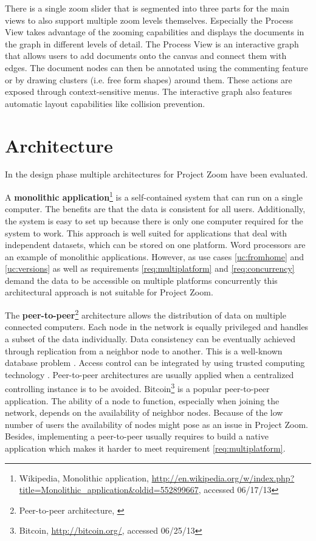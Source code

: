 There is a single zoom slider that is segmented into three parts for the main views to also support multiple zoom levels themselves. Especially the Process View takes advantage of the zooming capabilities and displays the documents in the graph in different levels of detail. 
The Process View is an interactive graph that allows users to add documents onto the canvas and connect them with edges. The document nodes can then be annotated using the commenting feature or by drawing clusters (i.e. free form shapes) around them. These actions are exposed through context-sensitive menus. The interactive graph also features automatic layout capabilities like collision prevention.

\section{Architecture}
In the design phase multiple architectures for Project Zoom have been evaluated. 

A \textbf{monolithic application}\footnote{Wikipedia, Monolithic application, \url{http://en.wikipedia.org/w/index.php?title=Monolithic_application&oldid=552899667}, accessed 06/17/13} is a self-contained system that can run on a single computer. The benefits are that the data is consistent for all users. Additionally, the system is easy to set up because there is only one computer required for the system to work. This approach is well suited for applications that deal with independent datasets, which can be stored on one platform. Word processors are an example of monolithic applications. However, as use cases \ref{uc:fromhome} and \ref{uc:versions} as well as requirements \ref{req:multiplatform} and \ref{req:concurrency} demand the data to be accessible on multiple platforms concurrently this architectural approach is not suitable for Project Zoom.

The \textbf{peer-to-peer}\footnote{Peer-to-peer architecture, \cite{Schollmeier_2001}} architecture allows the distribution of data on multiple connected computers. Each node in the network is equally privileged and handles a subset of the data individually. Data consistency can be eventually achieved through replication from a neighbor node to another. This is a well-known database problem \cite{Gray_1996}. Access control can be integrated by using trusted computing technology \cite{Sandhu_2005}. Peer-to-peer architectures are usually applied when a centralized controlling instance is to be avoided. Bitcoin\footnote{Bitcoin, \url{http://bitcoin.org/}, accessed 06/25/13} is a popular peer-to-peer application. The ability of a node to function, especially when joining the network, depends on the availability of neighbor nodes. Because of the low number of users the availability of nodes might pose as an issue in Project Zoom. Besides, implementing a peer-to-peer usually requires to build a native application which makes it harder to meet requirement \ref{req:multiplatform}.


